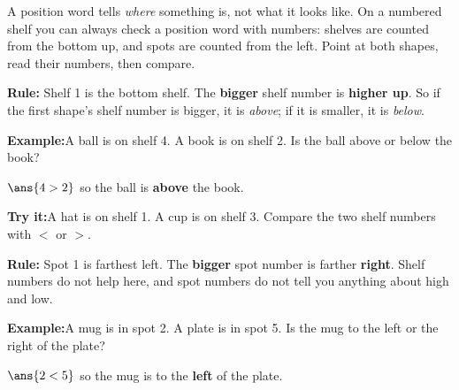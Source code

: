 \documentclass[12pt]{article}
\begin{document}

\noindent\small A position word tells \emph{where} something is, not what it
looks like. On a numbered shelf you can always check a position word with
numbers: shelves are counted from the bottom up, and spots are counted from the
left. Point at both shapes, read their numbers, then compare.\normalsize


\begin{formulabox}
\textbf{Rule:} Shelf 1 is the bottom shelf. The \textbf{bigger} shelf number is
\textbf{higher up}. So if the first shape's shelf number is bigger, it is
\emph{above}; if it is smaller, it is \emph{below}.
\end{formulabox}

\begin{examplebox}
\textbf{Example:}\quad A ball is on shelf 4. A book is on shelf 2. Is the ball
above or below the book?

$\ans{4 > 2}$ \quad so the ball is \textbf{above} the book.
\end{examplebox}

\begin{tryitbox}
\textbf{Try it:}\quad A hat is on shelf 1. A cup is on shelf 3. Compare the two
shelf numbers with $<$ or $>$.\\[2pt]
\end{tryitbox}


\begin{formulabox}
\textbf{Rule:} Spot 1 is farthest left. The \textbf{bigger} spot number is
farther \textbf{right}. Shelf numbers do not help here, and spot numbers do not
tell you anything about high and low.
\end{formulabox}

\begin{examplebox}
\textbf{Example:}\quad A mug is in spot 2. A plate is in spot 5. Is the mug to
the left or the right of the plate?

$\ans{2 < 5}$ \quad so the mug is to the \textbf{left} of the plate.
\end{examplebox}
\end{document}
